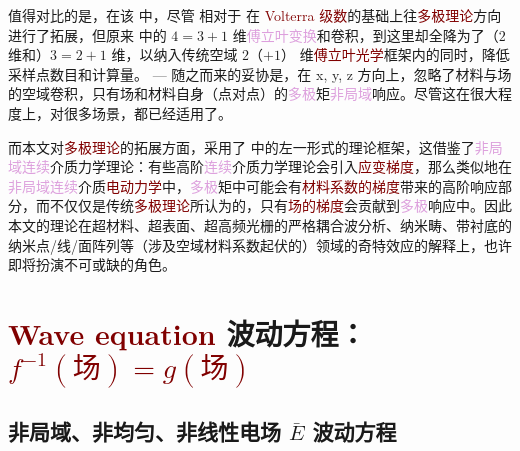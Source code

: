 值得对比的是，在该  中，尽管  相对于  在 \textcolor{Maroon}{Volterra 级数}的基础上往\textcolor{Maroon}{多极理论}方向进行了拓展，但原来  中的 $4=3+1$ 维\textcolor{Plum}{傅立叶变换}和卷积，到这里却全降为了（$2$ 维和）$3=2+1$ 维，以纳入传统空域 $2$（$+1$） 维\textcolor{Maroon}{傅立叶光学}框架内的同时，降低采样点数目和计算量。 ---  随之而来的妥协是，在 x, y, z 方向上，忽略了材料与场的空域卷积，只有场和材料自身（点对点）的\textcolor{Plum}{多极}矩\textcolor{Plum}{非局域}响应。尽管这在很大程度上，对很多场景，都已经适用了。

而本文对\textcolor{Maroon}{多极理论}的拓展方面，采用了  中的左一形式的理论框架，这借鉴了\textcolor{Plum}{非局域}\textcolor{Plum}{连续}介质力学理论：有些高阶\textcolor{Plum}{连续}介质力学理论会引入\textcolor{Maroon}{应变梯度}\cite{LiuYingHuaGaoJieLianXuJieZhiLiLun2024}，那么类似地在\textcolor{Plum}{非局域}\textcolor{Plum}{连续}介质\textcolor{Maroon}{电动力学}中，\textcolor{Plum}{多极}矩中可能会有\textcolor{Maroon}{材料系数的梯度}带来的高阶响应部分，而不仅仅是传统\textcolor{Maroon}{多极理论}所认为的，只有\textcolor{Maroon}{场的梯度}会贡献到\textcolor{Plum}{多极}响应中。因此本文的理论在超材料、超表面、超高频光栅的严格耦合波分析、纳米畴、带衬底的纳米点/线/面阵列等（涉及空域材料系数起伏的）领域的奇特效应的解释上，也许即将扮演不可或缺的角色。

\vspace*{-1.0em}

\section{\textcolor{Maroon}{Wave equation} 波动方程：\textcolor{Maroon}{$f^{-1}(\text{场}) = g(\text{场})$}}\label{sec:waveq}

\vspace*{-6.5em}

\subsection{非局域、非均匀、非线性电场 $\bar{E}$ 波动方程}\label{ssec:Exp-waveq}

